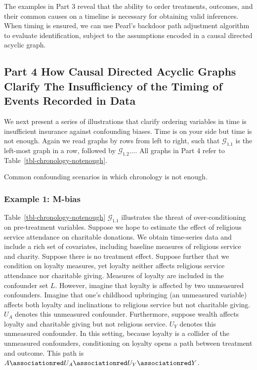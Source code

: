 \documentclass[
  single column]{article}
\begin{document}
The examples in Part 3 reveal that the ability to order treatments,
outcomes, and their common causes on a timeline is necessary for
obtaining valid inferences. When timing is ensured, we can use Pearl's
backdoor path adjustment algorithm to evaluate identification, subject
to the assumptions encoded in a causal directed acyclic graph.

\newpage{}

\subsection{Part 4 How Causal Directed Acyclic Graphs Clarify The
Insufficiency of the Timing of Events Recorded in Data}\label{id-sec-4}

We next present a series of illustrations that clarify ordering
variables in time is insufficient insurance against confounding biases.
Time is on your side but time is not enough. Again we read graphs by
rows from left to right, such that \(\mathcal{G}_{1.1}\) is the
left-most graph in a row, followed by \(\mathcal{G}_{1.2} \ldots\). All
graphs in Part 4 refer to Table~\ref{tbl-chronology-notenough}.

\begin{table}

\caption{\label{tbl-chronology-notenough}Common confounding scenarios in
which chronology is not enough.}

\centering{

\terminologychronologicalhygeineNOTENOUGH

}

\end{table}%

\subsubsection{Example 1: M-bias}\label{example-1-m-bias}

Table~\ref{tbl-chronology-notenough} \(\mathcal{G}_{1.1}\) illustrates
the threat of over-conditioning on pre-treatment variables. Suppose we
hope to estimate the effect of religious service attendance on
charitable donations. We obtain time-series data and include a rich set
of covariates, including baseline measures of religious service and
charity. Suppose there is no treatment effect. Suppose further that we
condition on loyalty measures, yet loyalty neither affects religious
service attendance nor charitable giving. Measures of loyalty are
included in the confounder set \(L\). However, imagine that loyalty is
affected by two unmeasured confounders. Imagine that one's childhood
upbringing (an unmeasured variable) affects both loyalty and
inclinations to religious service but not charitable giving. \(U_A\)
denotes this unmeasured confounder. Furthermore, suppose wealth affects
loyalty and charitable giving but not religious service. \(U_Y\) denotes
this unmeasured confounder. In this setting, because loyalty is a
collider of the unmeasured confounders, conditioning on loyalty opens a
path between treatment and outcome. This path is
\(A \associationred U_A \associationred U_Y \associationred Y\).
\end{document}
